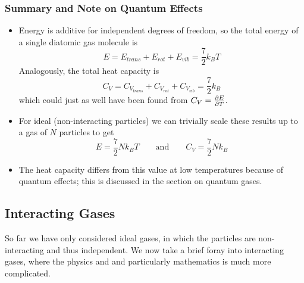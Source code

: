 \documentclass[11pt, a4paper]{article}
\begin{document}
\subsubsection{Summary and Note on Quantum Effects}
\begin{itemize}
	\item Energy is additive for independent degrees of freedom, so the total energy of a single diatomic gas molecule is
	\begin{equation*}
		E = E_{trans} + E_{rot} + E_{vib} = \frac{7}{2}k_{B}T
	\end{equation*}
	Analogously, the total heat capacity is
	\begin{equation*}
		C_{V} = C_{V_{trans}} +	C_{V_{rot}} + C_{V_{vib}} = \frac{7}{2}k_{B}
	\end{equation*}
	which could just as well have been found from $ C_{V} = \pdv{E}{T} $.
	
	\item For ideal (non-interacting particles) we can trivially scale these results up to a gas of $ N $ particles to get
	\begin{equation*}
		E = \frac{7}{2}Nk_{B}T \qquad \text{and} \qquad C_{V} = \frac{7}{2} N k_{B}
	\end{equation*}
	
	\item The heat capacity differs from this value at low temperatures because of quantum effects; this is discussed in the section on quantum gases.
\end{itemize}


\subsection{Interacting Gases}
So far we have only considered ideal gases, in which the particles are non-interacting and thus independent. We now take a brief foray into interacting gases, where the physics and and particularly mathematics is much more complicated.
\end{document}
